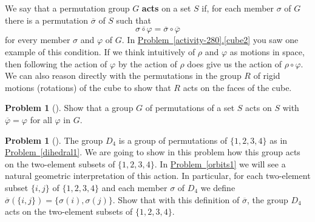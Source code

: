 \documentclass[10pt,]{book}
\newcommand{\terminology}[1]{\textbf{#1}}
\theoremstyle{plain}
\theoremstyle{definition}
\newtheorem{activity}[project]{Problem}
\theoremstyle{definition}
\numberwithin{equation}{chapter}
\begin{document}
We say that a permutation group \(G\) \terminology{acts} on a set \(S\) if, for each member \(\sigma\) of \(G\) there is a permutation \(\overline{\sigma}\) of \(S\) such that%
\begin{equation*}
\overline{\sigma\circ\varphi} = \overline{\sigma}\circ\overline{\varphi}
\end{equation*}
for every member \(\sigma\) and \(\varphi\) of \(G\). In \hyperref[cube2]{Problem~\ref{activity-280}.\ref{cube2}} you saw one example of this condition. If we think intuitively of \(\rho\) and \(\varphi\) as motions in space, then following the action of \(\varphi\) by the action of \(\rho\) does give us the action of \(\rho\circ \varphi\). We can also reason directly with the permutations in the group \(R\) of rigid motions (rotations) of the cube to show that \(R\) acts on the faces of the cube.%
\begin{activity}[]\marginsymbol[-1em]{} \label{activity-281}
Show that a group \(G\) of permutations of a set \(S\) acts on \(S\) with \(\overline{\varphi} = \varphi\) for all \(\varphi\) in \(G\).%
\end{activity}
\begin{activity}[] \label{D_4on2-sets}
The group \(D_4\) is a group of permutations of \(\{1,2,3,4\}\) as in \hyperref[dihedral1]{Problem~\ref{dihedral1}}. We are going to show in this problem how this group acts on the two-element subsets of \(\{1,2,3,4\}\). In \hyperref[orbits1]{Problem~\ref{orbits1}} we will see a natural geometric interpretation of this action. In particular, for each two-element subset \(\{i,j\}\) of \(\{1,2,3,4\}\) and each member \(\sigma\) of \(D_4\) we define \(\overline{\sigma}(\{i,j\}) = \{\sigma(i),\sigma(j)\}\).  Show that with this definition of \(\overline{\sigma}\), the group \(D_4\) acts on the two-element subsets of \(\{1,2,3,4\}\).%
\end{activity}
\end{document}
